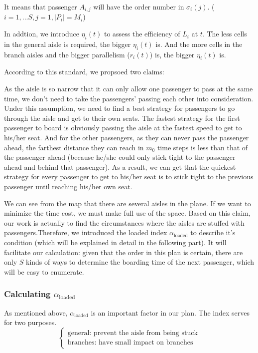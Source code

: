 \documentclass{article}
\begin{document}
	It means that passenger $A_{i,j}$ will have the order number in $\sigma_i (j)$. ($i=1,...S, j=1, \left|P_i \right|=M_i$)

	In addtion, we introduce $\eta_i (t)$ to assess the efficiency of $L_i$ at $t$. The less cells in the general aisle is required, the bigger $\eta_i (t)$ is. And the more cells in the branch aisles and the bigger parallelism ($r_i (t)$) is, the bigger $\eta_i (t)$ is.

	According to this standard, we propsoed two claims:
	\begin{enumerate}

		As the aisle is so narrow that it can only allow one passenger to pass at the same time, we don't need to take the passengers' passing each other into consideration. Under this assumption, we need to find a best strategy for passengers to go through the aisle and get to their own seats. The fastest strategy for the first passenger to board is obviously passing the aisle at the fastest speed to get to his/her seat. And for the other passengers, as they can never pass the passenger ahead, the farthest distance they can reach in $m_0$ time steps is less than that of the passenger ahead (because he/she could only stick tight to the passenger ahead and behind that passenger). As a result, we can get that the quickest strategy for every passenger to get to his/her seat is to stick tight to the previous passenger until reaching his/her own seat.

		We can see from the map that there are several aisles in the plane. If we want to minimize the time cost, we must make full use of the space. Based on this claim, our work is actually to find the circumstances where the aisles are stuffed with passengers.Therefore, we introduced the loaded index $\alpha_\text{loaded}$ to describe it's condition (which will be explained in detail in the following part). It will facilitate our calculation: given that the order in this plan is certain, there are only $S$ kinds of ways to determine the boarding time of the next passenger, which will be easy to enumerate.
	\end{enumerate}
	\subsubsection{ Calculating \(\alpha_\text{loaded}\)}
	As mentioned above, $\alpha_\text{loaded}$ is an important factor in our plan. The index serves for two purposes.
	$$
	\begin{cases}
		\text{general: prevent the aisle from being stuck}\\
		\text{branches: have small impact on branches}
	\end{cases}
	$$
\end{document}
